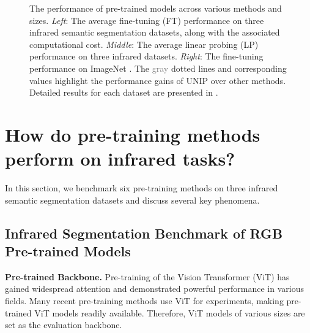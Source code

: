 \begin{figure}[t]
    \centering
    \vspace{-20pt}
    \caption{The performance of pre-trained models across various methods and sizes. \textit{Left}: The average fine-tuning (FT) performance on three infrared semantic segmentation datasets, along with the associated computational cost. \textit{Middle}: The average linear probing (LP) performance on three infrared datasets. \textit{Right}: The fine-tuning performance on ImageNet \citep{imagenet}. The \textcolor{gray}{gray} dotted lines and corresponding values highlight the performance gains of UNIP over other methods. Detailed results for each dataset are presented in .}
    \label{fig:benchmark}
    \vspace{-4pt}
\end{figure}

\section{How do pre-training methods perform on infrared tasks?}
\label{sec:benchmark}
In this section, we benchmark six pre-training methods on three infrared semantic segmentation datasets and discuss several key phenomena.

\subsection{Infrared Segmentation Benchmark of RGB Pre-trained Models}
\label{sec:benchmark_setup}
\textbf{Pre-trained Backbone.} Pre-training of the Vision Transformer (ViT) \citep{vit} has gained widespread attention and demonstrated powerful performance in various fields. Many recent pre-training methods \citep{deit,mae,iBOT,dinov2} use ViT for experiments, making pre-trained ViT models readily available. Therefore, ViT models of various sizes are set as the evaluation backbone.


